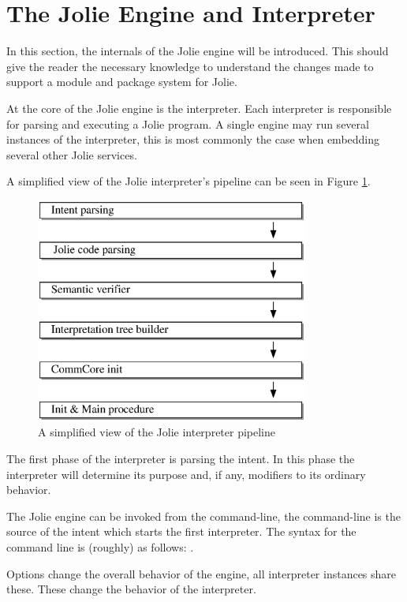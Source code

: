\section{The Jolie Engine and Interpreter}

In this section, the internals of the Jolie engine will be introduced. This
should give the reader the necessary knowledge to understand the changes made
to support a module and package system for Jolie.

At the core of the Jolie engine is the interpreter. Each interpreter is
responsible for parsing and executing a Jolie program. A single engine may run
several instances of the interpreter, this is most commonly the case when
embedding several other Jolie services.

A simplified view of the Jolie interpreter's pipeline can be seen in Figure
\ref{fig:jolie_pipeline}.

\begin{figure}[H]
\centering
\includegraphics[width=0.8\textwidth]{background/pipeline.eps}
\caption{A simplified view of the Jolie interpreter pipeline}
\label{fig:jolie_pipeline}
\end{figure}

The first phase of the interpreter is parsing the intent. In this phase the
interpreter will determine its purpose and, if any, modifiers to its ordinary
behavior.

The Jolie engine can be invoked from the command-line, the command-line is the
source of the intent which starts the first interpreter. The syntax for the
command line is (roughly) as follows: .

Options change the overall behavior of the engine, all interpreter instances
share these. These change the behavior of the interpreter.

